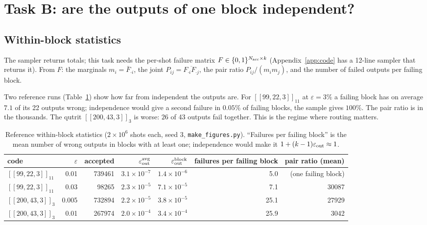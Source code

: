 \documentclass[11pt]{article}
\newcommand{\eps}{\varepsilon}
\newcommand{\code}[1]{\texttt{#1}}
\begin{document}
\section{Task B: are the outputs of one block independent?}
\label{sec:B}

\subsection{Within-block statistics}

The sampler returns totals; this task needs the per-shot failure matrix
$F\in\{0,1\}^{N_{\rm acc}\times k}$ (Appendix~\ref{app:code} has a 12-line sampler that
returns it). From $F$: the marginals $m_i = \bar F_{\cdot i}$, the joint
$P_{ij} = \overline{F_{\cdot i}F_{\cdot j}}$, the pair ratio $P_{ij}/(m_i m_j)$, and
the number of failed outputs per failing block.

Two reference runs (Table~\ref{tab:corr}) show how far from independent the outputs
are. For $[[99,22,3]]_{11}$ at $\eps=3\%$ a failing block has on average
$7.1$ of its 22 outputs wrong; independence would give a second failure in
$0.05\%$ of failing blocks, the sample gives $100\%$. The pair ratio is in the
thousands. The qutrit $[[200,43,3]]_3$ is worse: $26$ of 43 outputs fail together.
This is the regime where routing matters.

\begin{table}[h]\centering\small
\begin{tabular}{lrrrrrr}
\toprule
code & $\eps$ & accepted & $\eps_{\rm out}^{\rm avg}$ & $\eps_{\rm out}^{\rm block}$ & failures per failing block & pair ratio (mean) \\
\midrule
$[[99,22,3]]_{11}$ & 0.01 & 739461 & $3.1\times10^{-7}$ & $1.4\times10^{-6}$ & 5.0 & (one failing block) \\
$[[99,22,3]]_{11}$ & 0.03 & 98265 & $2.3\times10^{-5}$ & $7.1\times10^{-5}$ & 7.1 & 30087 \\
$[[200,43,3]]_{3}$ & 0.005 & 732894 & $2.2\times10^{-5}$ & $3.8\times10^{-5}$ & 25.1 & 27929 \\
$[[200,43,3]]_{3}$ & 0.01 & 267974 & $2.0\times10^{-4}$ & $3.4\times10^{-4}$ & 25.9 & 3042 \\
\bottomrule
\end{tabular}
\caption{Reference within-block statistics ($2\times10^6$ shots each, seed 3,
\code{make\_figures.py}). ``Failures per failing block'' is the mean number of wrong
outputs in blocks with at least one; independence would make it $1+(k-1)\eps_{\rm out}\approx1$.}
\label{tab:corr}
\end{table}
\end{document}
